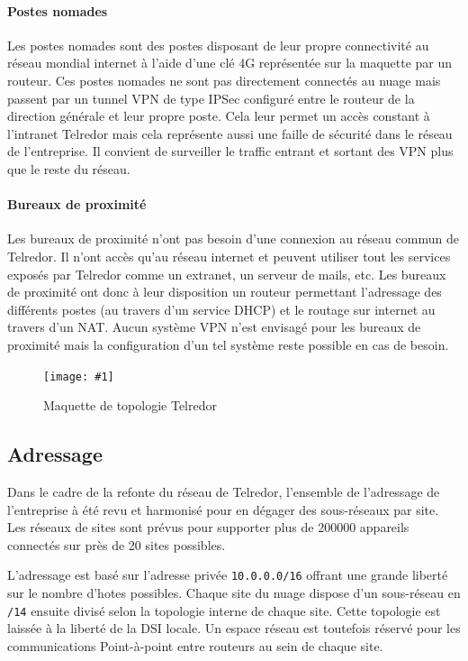 \documentclass{article}
\newenvironment{figue}[1]{
	\par
	\bigskip
	\begin{figure}[h]
	\begin{center}
	  \texttt{[image: \#1]}
	\end{center}
}{
	\end{figure}
	\bigskip
}
\newcommand{\tlr}{Telredor\xspace}
\begin{document}
\paragraph{Postes nomades} Les postes nomades sont des postes disposant de leur propre connectivité au réseau mondial internet à l'aide d'une clé 4G représentée sur la maquette par un routeur.
Ces postes nomades ne sont pas directement connectés au nuage mais passent par un tunnel VPN de type IPSec configuré entre le routeur de la direction générale et leur propre poste.
Cela leur permet un accès constant à l'intranet \tlr mais cela représente aussi une faille de sécurité dans le réseau de l'entreprise.
Il convient de surveiller le traffic entrant et sortant des VPN plus que le reste du réseau.

\paragraph{Bureaux de proximité} Les bureaux de proximité n'ont pas besoin d'une connexion au réseau commun de \tlr.
Il n'ont accès qu'au réseau internet et peuvent utiliser tout les services exposés par \tlr comme un extranet, un serveur de mails, etc.
Les bureaux de proximité ont donc à leur disposition un routeur permettant l'adressage des différents postes (au travers d'un service DHCP) et le routage sur internet au travers d'un NAT.
Aucun système VPN n'est envisagé pour les bureaux de proximité mais la configuration d'un tel système reste possible en cas de besoin.

\clearpage

\begin{figue}{img/telredor.pdf}
	\caption{Maquette de topologie \tlr}
\end{figue}

\subsection{Adressage}

Dans le cadre de la refonte du réseau de \tlr, l'ensemble de l'adressage de l'entreprise à été revu et harmonisé pour en dégager des sous-réseaux par site.
Les réseaux de sites sont prévus pour supporter plus de 200000 appareils connectés sur près de 20 sites possibles.

L'adressage est basé sur l'adresse privée \texttt{10.0.0.0/16} offrant une grande liberté sur le nombre d'hotes possibles.
Chaque site du nuage dispose d'un sous-réseau en \texttt{/14} ensuite divisé selon la topologie interne de chaque site.
Cette topologie est laissée à la liberté de la DSI locale.
Un espace réseau est toutefois réservé pour les communications Point-à-point entre routeurs au sein de chaque site.
\end{document}

